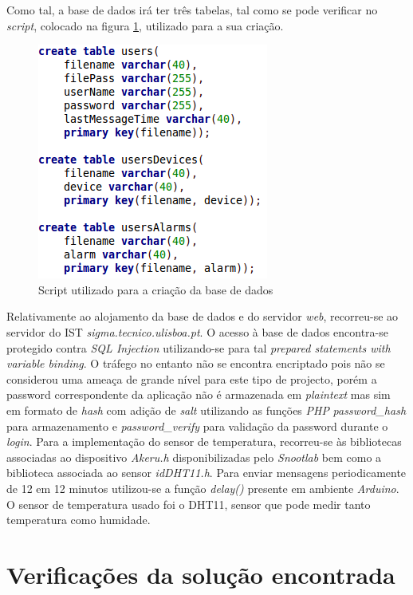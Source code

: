 \documentclass[a4paper]{article}
\begin{document}
Como tal, a base de dados irá ter três tabelas, tal como se pode verificar no \textit{script}, colocado na figura \ref{fig:db-script}, utilizado para a sua criação.

\begin{figure}[H]
  \centering
  \includegraphics[scale=0.50]{DB-script.png}
  \caption{Script utilizado para a criação da base de dados}
  \label{fig:db-script}
\end{figure}

Relativamente ao alojamento da base de dados e do servidor \textit{web}, recorreu-se ao servidor do IST \textit{sigma.tecnico.ulisboa.pt}. O acesso à base de dados encontra-se protegido contra \textit{SQL Injection} utilizando-se para tal \textit{prepared statements with variable binding}. O tráfego no entanto não se encontra encriptado pois não se considerou uma ameaça de grande nível para este tipo de projecto, porém a password correspondente da aplicação não é armazenada em \textit{plaintext} mas sim em formato de \textit{hash} com adição de \textit{salt} utilizando as funções \textit{PHP} \textit{password\_hash} para armazenamento e \textit{password\_verify} para validação da password durante o \textit{login}.
Para a implementação do sensor de temperatura, recorreu-se às bibliotecas associadas ao dispositivo \textit{Akeru.h} disponibilizadas pelo \textit{Snootlab} bem como a biblioteca associada ao sensor \textit{idDHT11.h}. Para enviar mensagens periodicamente de 12 em 12 minutos utilizou-se a função \textit{delay()} presente em ambiente \textit{Arduino}.
O sensor de temperatura usado foi o DHT11, sensor que pode medir tanto temperatura como humidade.

\section{Verificações da solução encontrada}
\end{document}
